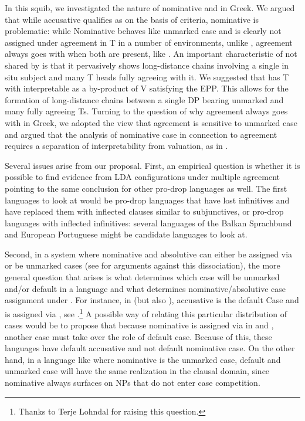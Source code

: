 \documentclass[output=paper]{langsci/langscibook}
\begin{document}
\begin{exe}
In this squib, we investigated the nature of nominative and  in
Greek. We argued that while accusative qualifies as  on the basis
of  criteria, nominative is problematic: while 
Nominative behaves like unmarked case and is clearly not assigned under
agreement in T in a number of environments, unlike , agreement always
goes with \Nom{} when both are present, like . An important characteristic
of  not shared by  is that it pervasively shows long-distance
chains involving a single in situ \Nom{} subject and many T heads fully agreeing
with it. We suggested that  has T with interpretable  as a
by-product of V  satisfying the \gls{EPP}. This allows for the formation
of long-distance chains between a single DP bearing unmarked \Nom{} and many fully
agreeing Ts. Turning to the question of why agreement always goes with \Nom{} in
Greek, we adopted the view that agreement is sensitive to unmarked case and
argued that the analysis of  nominative case in connection to agreement
requires a separation of interpretability from valuation, as in
\citet{PesetskyTorrego2007}.

Several issues arise from our proposal. First, an empirical question is whether
it is possible to find evidence from \gls{LDA} configurations under multiple
agreement pointing to the same conclusion for other pro-drop languages as well.
The first languages to look at would be pro-drop languages that have lost
infinitives and have replaced them with inflected clauses similar to 
subjunctives, or pro-drop languages with inflected infinitives: several
languages of the Balkan Sprachbund and European Portuguese might be candidate
languages to look at.

Second, in a system where nominative and absolutive can either be assigned via
 or be unmarked cases (see \citealt{LevPre2015} for arguments against this
dissociation), the more general question that arises is what determines which
case will be unmarked and/or default in a language and what determines
nominative/absolutive case assignment under . For instance, in 
(but also ), accusative is the default Case and \Nom{} is assigned via
, see \citet{Schutze2001,McFadden2004}.\footnote{Thanks to Terje Lohndal
for raising this question.} A possible way of relating this particular
distribution of cases would be to propose that because nominative is assigned
via  in  and , another case must take over the role of
default case. Because of this, these languages have default accusative and not
default nominative case.  On the other hand, in a language like  where
nominative is the unmarked case, default and unmarked case will have the same
realization in the clausal domain, since nominative always surfaces on NPs that
do not enter case competition.


\end{exe}
\end{document}
